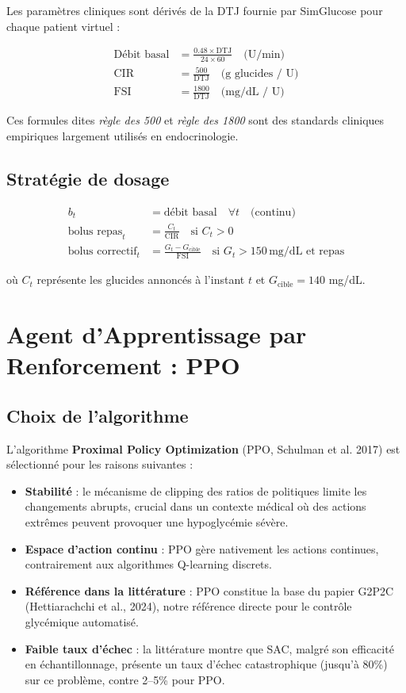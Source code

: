 \documentclass[a4paper,12pt]{report}
\begin{document}
Les paramètres cliniques sont dérivés de la DTJ fournie par SimGlucose pour chaque patient virtuel :

\begin{align}
  \text{Débit basal} &= \frac{0.48 \times \text{DTJ}}{24 \times 60} \quad \text{(U/min)} \\[6pt]
  \text{CIR} &= \frac{500}{\text{DTJ}} \quad \text{(g glucides / U)} \\[6pt]
  \text{FSI} &= \frac{1800}{\text{DTJ}} \quad \text{(mg/dL / U)}
\end{align}

Ces formules dites \textit{règle des 500} et \textit{règle des 1800} sont des standards cliniques empiriques largement utilisés en endocrinologie.

\subsection{Stratégie de dosage}

\begin{align}
  b_t &= \text{débit basal} \quad \forall t \quad \text{(continu)} \\[4pt]
  \text{bolus repas}_t &= \frac{C_t}{\text{CIR}} \quad \text{si } C_t > 0 \\[4pt]
  \text{bolus correctif}_t &= \frac{G_t - G_{\text{cible}}}{\text{FSI}} \quad \text{si } G_t > 150\,\text{mg/dL et repas}
\end{align}

où $C_t$ représente les glucides annoncés à l'instant $t$ et $G_{\text{cible}} = 140$ mg/dL.

\section{Agent d'Apprentissage par Renforcement : PPO}

\subsection{Choix de l'algorithme}

L'algorithme \textbf{Proximal Policy Optimization} (PPO, Schulman et al. 2017) est sélectionné pour les raisons suivantes :
\begin{itemize}
  \item \textbf{Stabilité} : le mécanisme de clipping des ratios de politiques limite les changements abrupts, crucial dans un contexte médical où des actions extrêmes peuvent provoquer une hypoglycémie sévère.
  \item \textbf{Espace d'action continu} : PPO gère nativement les actions continues, contrairement aux algorithmes Q-learning discrets.
  \item \textbf{Référence dans la littérature} : PPO constitue la base du papier G2P2C (Hettiarachchi et al., 2024), notre référence directe pour le contrôle glycémique automatisé.
  \item \textbf{Faible taux d'échec} : la littérature montre que SAC, malgré son efficacité en échantillonnage, présente un taux d'échec catastrophique (jusqu'à 80\%) sur ce problème, contre 2--5\% pour PPO.
\end{itemize}
\end{document}
